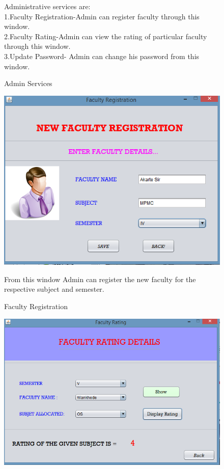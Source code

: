 \documentclass[12 pt,a4paper]{report}
\begin{document}
\begin{center}
\begin{figure}[ht]
\begin{center}
\caption{Admin Services}
\vspace{0.2 cm}
\justify
{Administrative services are:}\\
{1.Faculty Registration-Admin can register faculty through this window. }\\
{2.Faculty Rating-Admin can view the rating of particular faculty through this window.}\\
{3.Update Password- Admin can change his password from this window.}
\end{center}
\end{figure}
\begin{figure}[ht]
\begin{center}
\includegraphics[scale=.7]{facultyreg.png}\\
\caption{Faculty Registration}
\vspace{0.2 cm}
\justify
{From this window Admin can register the new faculty for the respective subject and semester.}
\end{center}
\end{figure}
\begin{figure}[ht]
\begin{center}
\includegraphics[scale=.7]{rating.png}\\

\end{center}
\end{figure}
\end{center}
\end{document}
